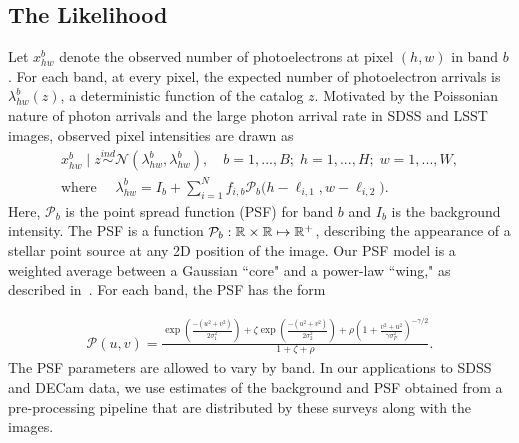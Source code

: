 \subsection{The Likelihood}
Let $x_{hw}^b$ denote the observed number of photoelectrons at pixel $(h,w)$ in band $b$.
For each band, at every pixel, the expected number of photoelectron arrivals is $\lambda^b_{hw}(z)$, a deterministic function of the catalog $z$. Motivated by the Poissonian nature of photon arrivals and
the large photon arrival rate in SDSS and LSST images,
observed pixel intensities are drawn as
\begin{align}
  x_{hw}^b \mid z \overset{ind}{\sim} \mathcal{N}(\lambda^b_{hw}, \lambda^b_{hw}),
  \quad
  b = 1, ..., B; \;
  h = 1,..., H; \;
  w = 1, ..., W, \\
 \text{where } \quad
 \lambda^b_{hw} = I_b + \sum_{i = 1}^N f_{i,b} \mathcal{P}_b\big(h - \ell_{i, 1}, w - \ell_{i, 2}\big).
  \label{eq:expected_intensity}
\end{align}
Here, $\mathcal{P}_b$ is the point spread function (PSF) for band $b$ and $I_b$ is the background intensity.
The PSF is a function
$\mathcal{P}_b : \mathbb{R} \times \mathbb{R} \mapsto \mathbb{R}^+$,
describing the appearance of a stellar point source at any 2D position of the image.
Our PSF model is a weighted average between a Gaussian ``core" and a power-law ``wing," as described in~\cite{Xin2018psf}. For each band, the PSF has the form

\begin{align}
    \mathcal{P}(u,v) =
    \frac{\exp(\frac{-(u^2 + v^2)}{2\sigma_1^2}) +
    \zeta \exp(\frac{-(u^2 + v^2)}{2\sigma_2^2}) +
    \rho(1 + \frac{v^2 + u^2}{\gamma\sigma^2_P})^{-\gamma/2} }{1 + \zeta + \rho}.
\end{align}
The PSF parameters are allowed to vary by band.
In our applications to SDSS and DECam data, we use estimates of the background
and PSF obtained from a pre-processing pipeline that are distributed by these surveys along with the images.


